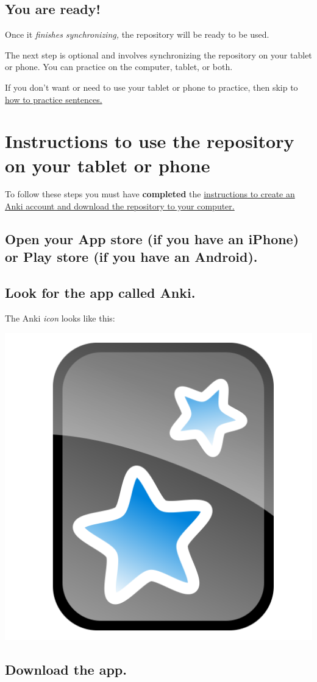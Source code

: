 \documentclass[
]{book}
\begin{document}
\hypertarget{you-are-ready}{%
\section{You are ready!}\label{you-are-ready}}

Once it \emph{finishes synchronizing,} the repository will be ready to be used.

The next step is optional and involves synchronizing the repository on your tablet or phone. You can practice on the computer, tablet, or both.

If you don't want or need to use your tablet or phone to practice, then skip to \protect\hyperlink{cross_5}{how to practice sentences.}

\hypertarget{instructions-to-use-the-repository-on-your-tablet-or-phone}{%
\chapter{Instructions to use the repository on your tablet or phone}\label{instructions-to-use-the-repository-on-your-tablet-or-phone}}

To follow these steps you must have \textbf{completed} the \protect\hyperlink{cross_3}{instructions to create an Anki account and download the repository to your computer.}

\hypertarget{open-your-app-store-if-you-have-an-iphone-or-play-store-if-you-have-an-android.}{%
\section{Open your App store (if you have an iPhone) or Play store (if you have an Android).}\label{open-your-app-store-if-you-have-an-iphone-or-play-store-if-you-have-an-android.}}

\hypertarget{look-for-the-app-called-anki.}{%
\section{Look for the app called Anki.}\label{look-for-the-app-called-anki.}}

The Anki \emph{icon} looks like this:

\includegraphics[width=0.1\linewidth]{images/reposit_en/Anki_logo}

\hypertarget{download-the-app.}{%
\section{Download the app.}\label{download-the-app.}}
\end{document}

